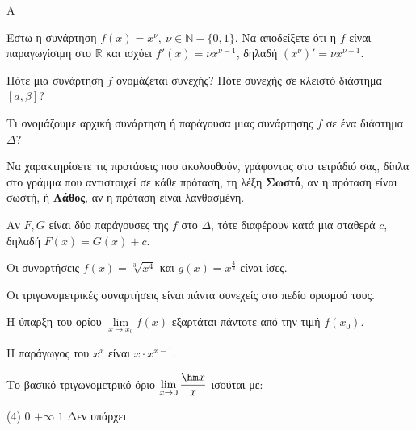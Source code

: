 \begin{thema}{A}
\begin{erwthma}
    \item Έστω η συνάρτηση $ f(x)=x^{\nu},\ \nu\in\mathbb{N}-\{0,1\} $. Να αποδείξετε ότι η $ f $ είναι παραγωγίσιμη στο $ \mathbb{R} $ και ισχύει $ f'(x)=\nu x^{\nu-1} $, δηλαδή $ \left(x^\nu\right)'=\nu x^{\nu-1} $.
    \item Πότε μια συνάρτηση $f$ ονομάζεται συνεχής? Πότε συνεχής σε κλειστό διάστημα $[a, \beta]$?
    \item Τι ονομάζουμε αρχική συνάρτηση ή παράγουσα μιας συνάρτησης $f$ σε ένα διάστημα $\Delta$?
    \item Να χαρακτηρίσετε τις προτάσεις που ακολουθούν, γράφοντας στο τετράδιό σας, δίπλα στο γράμμα που αντιστοιχεί σε κάθε πρόταση, τη λέξη \textbf{Σωστό}, αν η πρόταση είναι σωστή, ή \textbf{Λάθος}, αν η πρόταση είναι λανθασμένη.
    \begin{alist}
        \item Αν $F, G$ είναι δύο παράγουσες της $f$ στο $\Delta$, τότε διαφέρουν κατά μια σταθερά $c$, δηλαδή $F(x) = G(x) + c$.
        \item Οι συναρτήσεις $f(x)=\sqrt[3]{x^4}$ και $g(x)=x^{\frac{4}{3}}$ είναι ίσες.
        \item Οι τριγωνομετρικές συναρτήσεις είναι πάντα συνεχείς στο πεδίο ορισμού τους.
        \item Η ύπαρξη του ορίου $\lim\limits_{x\to x_0} f(x)$ εξαρτάται πάντοτε από την τιμή $f(x_0)$.
        \item Η παράγωγος του $x^x$ είναι $x \cdot x^{x-1}$.
    \end{alist}
    \item Το βασικό τριγωνομετρικό όριο $\lim\limits_{x\to 0} \dfrac{\hm x}{x}$ ισούται με:
    \begin{tasks}[label=\let\textdexiakeraia\relax\alph*.](4)
        \task $0$
        \task $+\infty$
        \task $1$
        \task Δεν υπάρχει
    \end{tasks}
\end{erwthma}
\end{thema}


